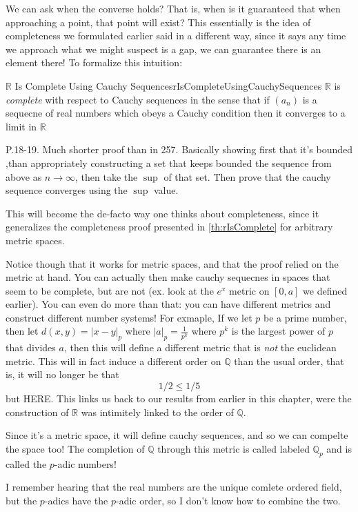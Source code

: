 \documentclass{book}
\newcommand{\Q}{{\mathbb{Q}}}
\newcommand{\R}{{\mathbb{R}}}
\newcommand{\rw}{\rightarrow}
\newenvironment{Proof}[1][]
  {\begin{ProofTcb}[#1]}
  {\end{ProofTcb}}
\begin{document}
We can ask when the converse holds? That is, when is it guaranteed that when approaching a point, that point will exist?
This essentially is the idea of completeness we formulated earlier said in a different way, since it says any time we
approach what we might suspect is a gap, we can guarantee there is an element there! To formalize this intuition:
\begin{thm}{$\R$ Is Complete Using Cauchy Sequences}{rIsCompleteUsingCauchySequences}
	$\R$ is \emph{complete} with respect to Cauchy sequences in the sense that if $(a_n)$ is a sequecne of real numbers
	which obeys a Cauchy condition then it converges to a limit in $\R$
\end{thm}

\begin{Proof}
	P.18-19. Much shorter proof than in 257. Basically showing first that it's bounded ,than appropriately constructing
	a set that keeps bounded the sequence from above as $n \rw \infty$, then take the $\sup$ of that set. Then prove
	that the cauchy sequence converges using the $\sup$ value.
\end{Proof}

This will become the de-facto way one thinks about completeness, since it generalizes the completeness proof presented
in \ref{th:rIsComplete} for arbitrary metric spaces.


Notice though that it works for metric spaces, and that the proof relied on the metric at hand. You can actually then
make cauchy sequecnes in spaces that seem to be complete, but are not (ex. look at the $e^x$ metric on $[0,a]$ we
defined earlier). You can even do more than that: you can have different metrics and construct different number systems!
For exmaple, If we let $p$ be a prime number, then let $d(x,y) = |x - y|_p$ where $|a|_p = \frac{1}{p^k}$ where $p^k$ is
the largest power of $p$ that divides $a$, then this will define a different metric that is \emph{not} the euclidean
metric. This will in fact induce a different order on $\Q$ than the usual order, that is, it will no longer be that
\[
	1/2 \le 1/5
\]
but HERE. This links us back to our results from earlier in this chapter, were the construction of $\R$ was intimitely
linked to the order of $\Q$.

Since it's a metric space, it will define cauchy sequences, and so we can compelte the space too! The completion
of $\Q$ through this metric is called labeled $\Q_p$ and is called the $p$-adic numbers!


I remember hearing that the real numbers are the unique comlete ordered field, but the $p$-adics have the $p$-adic
order, so I don't know how to combine the two.
\end{document}
